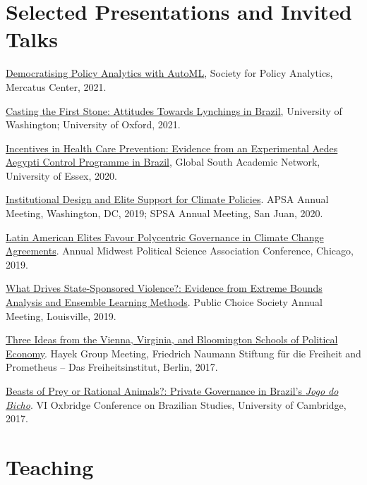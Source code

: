\documentclass[a4paper]{article}
\renewenvironment{itemize}{
	\begin{list}{}{
			\setlength{\leftmargin}{1.5em}
		}
		}{
	\end{list}
}
\begin{document}
\section*{Selected Presentations and Invited Talks}

\begin{itemize}
\item \href{http://github.com/danilofreire/mercatus-analytics-papers}{Democratising Policy Analytics with AutoML}, Society for Policy Analytics, Mercatus Center, 2021.
\item \href{https://github.com/danilofreire/lynching-experiment-brazil}{Casting the First Stone: Attitudes Towards Lynchings in Brazil}, University of Washington; University of Oxford, 2021.
\item \href{https://danilofreire.github.io/essex2020/aedes.html}{Incentives in Health Care Prevention:
Evidence from an Experimental Aedes Aegypti Control Programme in Brazil}, Global South Academic Network, University of Essex, 2020.
\item \href{https://osf.io/9a6ch}{Institutional Design and Elite Support for Climate Policies}. APSA Annual Meeting, Washington, DC, 2019; SPSA Annual Meeting, San Juan, 2020.
\item \href{https://osf.io/9a6ch}{Latin American Elites Favour Polycentric Governance in Climate Change Agreements}. Annual Midwest Political Science Association Conference, Chicago, 2019.
\item \href{http://danilofreire.github.io/pcs-2019}{What Drives State-Sponsored Violence?: Evidence from Extreme Bounds Analysis and Ensemble Learning Methods}. Public Choice Society Annual Meeting, Louisville, 2019.
\item \href{https://www.overleaf.com/project/591ef5259fb58ede3dc4d369}{Three Ideas from the Vienna, Virginia, and Bloomington Schools of Political Economy}. Hayek Group Meeting, Friedrich Naumann Stiftung f{\"u}r die Freiheit and Prometheus -- Das Freiheitsinstitut, Berlin, 2017.
\item \href{https://osf.io/se2jr}{Beasts of Prey or Rational Animals?: Private Governance in Brazil's \emph{Jogo do Bicho}}. VI Oxbridge Conference on Brazilian Studies, University of Cambridge, 2017.
\end{itemize}

\section*{Teaching}
\end{document}
